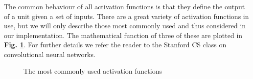 \noindent The common behaviour of all activation functions is that they define the output of a unit given a set of inputs. There are a great variety of activation functions in use, but we will only describe those most commonly used and thus considered in our implementation. The mathematical function of three of these are plotted in \textbf{Fig. \ref{activationfuncs}}. For further details we refer the reader to the Stanford CS class on convolutional neural networks\cite{cs231n_part1}. \\
\begin{figure}[H]
    \begin{minipage}{0.3\textwidth}
    \end{minipage}
    \begin{minipage}{0.3\textwidth}
    \end{minipage}
    \begin{minipage}{0.3\textwidth}
    \end{minipage}
    \caption{The most commonly used activation functions}
    \label{activationfuncs}
\end{figure}

